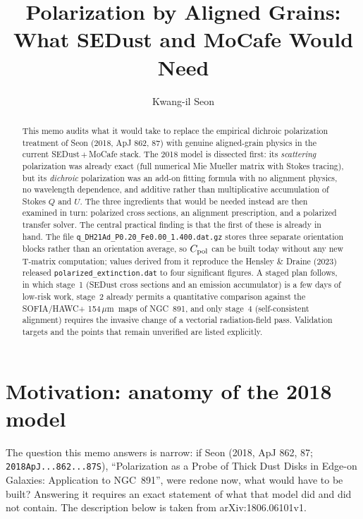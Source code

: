 \documentclass{my_memo}
\title{Polarization by Aligned Grains: What SEDust and MoCafe Would Need}
\author{Kwang-il Seon}
\date{\docmoddate}
\newcommand{\code}[1]{\texttt{#1}}
\newcommand{\um}{\ensuremath{\,\mu\mathrm{m}}}
\newcommand{\Cpol}{\ensuremath{C_{\rm pol}}}
\begin{document}
\maketitle

\begin{abstract}
\noindent
This memo audits what it would take to replace the empirical dichroic
polarization treatment of Seon (2018, ApJ 862, 87) with genuine
aligned-grain physics in the current SEDust\,$+$\,MoCafe stack. The 2018
model is dissected first: its \emph{scattering} polarization was already
exact (full numerical Mie Mueller matrix with Stokes tracing), but its
\emph{dichroic} polarization was an add-on fitting formula with no
alignment physics, no wavelength dependence, and additive rather than
multiplicative accumulation of Stokes $Q$ and $U$. The three ingredients
that would be needed instead are then examined in turn: polarized cross
sections, an alignment prescription, and a polarized transfer solver. The
central practical finding is that the first of these is already in hand.
The file \code{q\_DH21Ad\_P0.20\_Fe0.00\_1.400.dat.gz} stores three
separate orientation blocks rather than an orientation average, so
$\Cpol$ can be built today without any new T-matrix computation; values
derived from it reproduce the Hensley \& Draine (2023) released
\code{polarized\_extinction.dat} to four significant figures. A staged
plan follows, in which stage~1 (SEDust cross sections and an emission
accumulator) is a few days of low-risk work, stage~2 already permits a
quantitative comparison against the SOFIA/HAWC+ 154\um\ maps of NGC~891,
and only stage~4 (self-consistent alignment) requires the invasive change
of a vectorial radiation-field pass. Validation targets and the points
that remain unverified are listed explicitly.
\end{abstract}

\tableofcontents

\section{Motivation: anatomy of the 2018 model}
\label{sec:motivation}

The question this memo answers is narrow: if Seon (2018, ApJ 862, 87;
\code{2018ApJ...862...87S}), ``Polarization as a Probe of Thick Dust
Disks in Edge-on Galaxies: Application to NGC~891'', were redone now,
what would have to be built? Answering it requires an exact statement of
what that model did and did not contain. The description below is taken
from arXiv:1806.06101v1.
\end{document}
